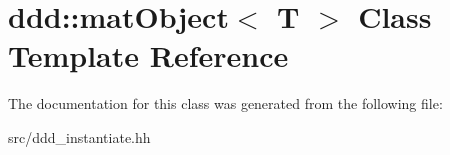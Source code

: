\hypertarget{classddd_1_1mat_object}{}\section{ddd\+:\+:mat\+Object$<$ T $>$ Class Template Reference}
\label{classddd_1_1mat_object}


The documentation for this class was generated from the following file\+:\begin{DoxyCompactItemize}
\item 
src/ddd\+\_\+instantiate.\+hh\end{DoxyCompactItemize}
